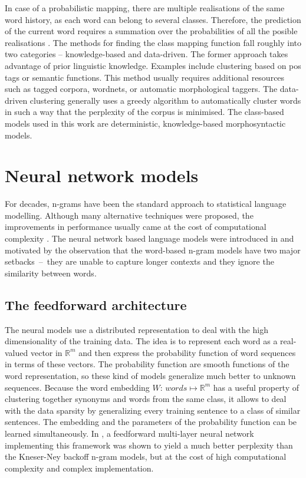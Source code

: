 	In case of a probabilistic mapping, there are multiple realisations of the same word history, as each word can belong to several classes. Therefore, the prediction of the current word requires a summation over the probabilities of all the posible realisations \cite{ney1994structuring}.
	The methods for finding the class mapping function fall roughly into two categories -- knowledge-based and data-driven. The former approach takes advantage of prior linguistic knowledge. Examples include clustering based on \gls{pos} tags or semantic functions. This method usually requires additional resources such as tagged corpora, wordnets, or automatic morphological taggers. The data-driven clustering generally uses a greedy algorithm to automatically cluster words in such a way that the perplexity of the corpus is minimised. The class-based models used in this work are deterministic, knowledge-based morphosyntactic models.
	\section{Neural network models}
	\label{section:rnn}
	For decades, n-grams have been the standard approach to statistical language modelling. Although many alternative techniques were proposed, the improvements in performance usually came at the cost of computational complexity \cite{mikolov2011rnnlm}. The neural network based language models were introduced in \cite{bengio2003neural} and motivated by the observation that the word-based n-gram models have two major setbacks~--~they are unable to capture longer contexts and they ignore the similarity between words. 
	\subsection{The feedforward architecture}	
The neural models use a distributed representation to deal with the high dimensionality of the training data. The idea is to represent each word as a real-valued vector in $\mathbb{R}^{m}$ and then express the probability function of word sequences in terms of these vectors. The probability function are smooth functions of the word representation, so these kind of models generalize much better to unknown sequences. Because the word embedding $W$: $words \mapsto \mathbb{R}^{m}$ has a useful property of clustering together synonyms and words from the same class, it allows to deal with the data sparsity by generalizing every training sentence to a class of similar sentences. The embedding and the parameters of the probability function can be learned simultaneously. In \cite{bengio2003neural}, a feedforward multi-layer neural network implementing this framework was shown to yield a much better perplexity than the Kneser-Ney backoff n-gram models, but at the cost of high computational complexity and complex implementation.
